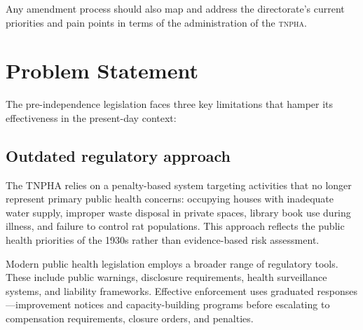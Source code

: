 \documentclass[a4paper,11pt]{article}
\begin{document}
Any amendment process should also map and address the directorate's current priorities and pain points in terms of the administration of the \textsc{tnpha}. 

\section{Problem Statement}

The pre-independence legislation faces three key limitations that hamper its effectiveness in the present-day context:
    \subsection{Outdated regulatory approach} 
    
    The TNPHA relies on a penalty-based system targeting activities that no longer represent primary public health concerns: occupying houses with inadequate water supply, improper waste disposal in private spaces, library book use during illness, and failure to control rat populations. This approach reflects the public health priorities of the 1930s rather than evidence-based risk assessment.
    
    Modern public health legislation employs a broader range of regulatory tools. These include public warnings, disclosure requirements, health surveillance systems, and liability frameworks. Effective enforcement uses graduated responses—improvement notices and capacity-building programs before escalating to compensation requirements, closure orders, and penalties.
\end{document}
